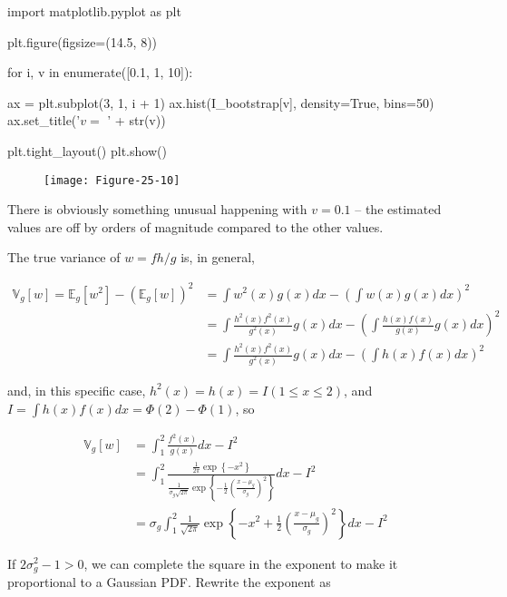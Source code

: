 \begin{python}
import matplotlib.pyplot as plt

plt.figure(figsize=(14.5, 8))

for i, v in enumerate([0.1, 1, 10]):
    
    ax = plt.subplot(3, 1, i + 1)
    ax.hist(I_bootstrap[v], density=True, bins=50)
    ax.set_title('$v = $ ' + str(v))

plt.tight_layout()
plt.show()
\end{python}

\begin{figure}[H]
\texttt{[image: Figure-25-10]}
\end{figure}

There is obviously something unusual happening with \(v = 0.1\) -- the
estimated values are off by orders of magnitude compared to the other
values.

The true variance of \(w = f h / g\) is, in general,

\[
\begin{align}
\mathbb{V}_g[w] = \mathbb{E}_g[w^2] - (\mathbb{E}_g[w])^2 &= \int w^2(x) g(x) dx - \left( \int w(x) g(x) dx \right)^2 \\
&= \int \frac{h^2(x) f^2(x)}{g^2(x)} g(x) dx - \left( \int \frac{h(x) f(x)}{g(x)} g(x) dx \right)^2 \\
&= \int \frac{h^2(x) f^2(x)}{g^2(x)} g(x) dx - \left( \int h(x) f(x) dx \right)^2
\end{align}
\]

and, in this specific case, \(h^2(x) = h(x) = I(1 \leq x \leq 2)\), and
\(I = \int h(x) f(x) dx = \Phi(2) - \Phi(1)\), so

\[
\begin{align}
\mathbb{V}_g[w] &= \int_1^2 \frac{f^2(x)}{g(x)} dx - I^2 \\
&= \int_1^2 \frac{\frac{1}{2 \pi} \exp \left\{-x^2 \right\}}{\frac{1}{\sigma_g \sqrt{2 \pi}} \exp \left\{-\frac{1}{2} \left(\frac{x - \mu_g}{\sigma_g}\right)^2 \right\} } dx - I^2 \\
&= \sigma_g \int_1^2 \frac{1}{\sqrt{2 \pi}} \exp \left\{ -x^2 +\frac{1}{2} \left(\frac{x - \mu_g}{\sigma_g}\right)^2 \right\} dx - I^2
\end{align}
\]

If \(2 \sigma_g^2 - 1 > 0\), we can complete the square in the exponent
to make it proportional to a Gaussian PDF. Rewrite the exponent as

